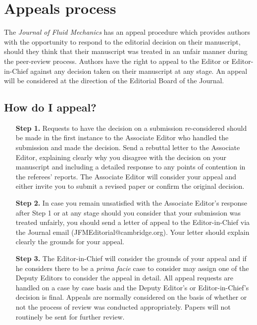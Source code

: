 \documentclass[lineno]{jfm}
\begin{document}
{{\section{Appeals process}

The {\it Journal of Fluid Mechanics} has an appeal procedure which provides authors with the opportunity to respond to the editorial decision on their manuscript, should they think that their manuscript was treated in an unfair manner during the peer-review process.  Authors have the right to appeal to the Editor or Editor-in-Chief against any decision taken on their manuscript at any stage.  An appeal will be considered at the direction of the Editorial Board of the Journal.
\subsection {How do I appeal?}
\begin{itemize}
\item[{\bf Step 1.}] Requests to have the decision on a submission re-considered should be made in the first instance to the Associate Editor who handled the submission and made the decision.  Send a rebuttal letter to the Associate Editor, explaining clearly why you disagree with the decision on your manuscript and including a detailed response to any points of contention in the referees' reports.  The Associate Editor will consider your appeal and either invite you to submit a revised paper or confirm the original decision.
\item[{\bf Step 2.}]In case you remain unsatisfied with the Associate Editor's response after Step 1 or at any stage should you consider that your submission was treated unfairly, you should send a letter of appeal to the Editor-in-Chief via the Journal email (JFMEditorial@cambridge.org). Your letter should explain clearly the grounds for your appeal.
\item[{\bf Step 3.}] The Editor-in-Chief will consider the grounds of your appeal and if he considers there to be a {\it prima facie} case to consider may assign one of the Deputy Editors to consider the appeal in detail.  All appeal requests are handled on a case by case basis and the Deputy Editor's or Editor-in-Chief's decision is final.  Appeals are normally considered on the basis of whether or not the process of review was conducted appropriately.  Papers will not routinely be sent for further review.
\end{itemize}

\appendix

}}
\end{document}

